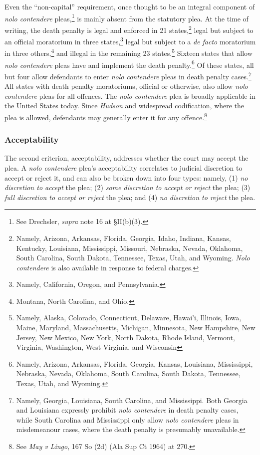 Even the ``non-capital'' requirement, once thought to be an integral component of \textit{nolo contendere} pleas,\footnote{See Drechsler, \textit{supra} note 16 at \S II(b)(3).} is mainly absent from the statutory plea. At the time of writing, the death penalty is legal and enforced in 21 states,\footnote{Namely, Arizona, Arkansas, Florida, Georgia, Idaho, Indiana, Kansas, Kentucky, Louisiana, Mississippi, Missouri, Nebraska, Nevada, Oklahoma, South Carolina, South Dakota, Tennessee, Texas, Utah, and Wyoming. \textit{Nolo contendere} is also available in response to federal charges.} legal but subject to an official moratorium in three states,\footnote{Namely, California, Oregon, and Pennsylvania.} legal but subject to a \textit{de facto} moratorium in three others,\footnote{Montana, North Carolina, and Ohio.} and illegal in the remaining 23 states.\footnote{Namely, Alaska, Colorado, Connecticut, Delaware, Hawai'i, Illinois, Iowa, Maine, Maryland, Massachusetts, Michigan, Minnesota, New Hampshire, New Jersey, New Mexico, New York, North Dakota, Rhode Island, Vermont, Virginia, Washington, West Virginia, and Wisconsin} Sixteen states that allow \textit{nolo contendere} pleas have and implement the death penalty.\footnote{Namely, Arizona, Arkansas, Florida, Georgia, Kansas, Louisiana, Mississippi, Nebraska, Nevada, Oklahoma, South Carolina, South Dakota, Tennessee, Texas, Utah, and Wyoming.}  Of these states, all but four allow defendants to enter \textit{nolo contendere} pleas in death penalty cases.\footnote{Namely, Georgia, Louisiana, South Carolina, and Mississippi. Both Georgia and Louisiana expressly prohibit \textit{nolo contendere} in death penalty cases, while South Carolina and Mississippi only allow \textit{nolo contendere} pleas in misdemeanour cases, where the death penalty is presumably unavailable.} All states with death penalty moratoriums, official or otherwise, also allow \textit{nolo contendere} pleas for all offences. The \textit{nolo contendere} plea is broadly applicable in the United States today. Since \textit{Hudson} and widespread codification, where the plea is allowed, defendants may generally enter it for any offence.\footnote{See \textit{May v Lingo}, 167 So (2d) (Ala Sup Ct 1964) at 270.}

\subsubsection{Acceptability}

The second criterion, acceptability, addresses whether the court may accept the plea. A \textit{nolo contendere} plea's acceptability correlates to judicial discretion to accept or reject it, and can also be broken down into four types: namely, (1) \textit{no discretion to accept} the plea; (2) \textit{some discretion to accept or reject} the plea; (3) \textit{full discretion to accept or reject} the plea; and (4) \textit{no discretion to reject} the plea.

